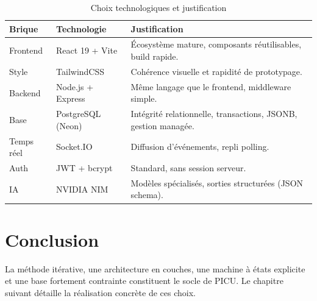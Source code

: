 \begin{table}[H]
\centering
\caption{Choix technologiques et justification}
\label{tab:choix}
\small
\begin{tabular}{|l|l|p{6.4cm}|}
\hline
\textbf{Brique} & \textbf{Technologie} & \textbf{Justification} \\
\hline
Frontend & React 19 + Vite & Écosystème mature, composants réutilisables, build rapide. \\
\hline
Style & TailwindCSS & Cohérence visuelle et rapidité de prototypage. \\
\hline
Backend & Node.js + Express & Même langage que le frontend, middleware simple. \\
\hline
Base & PostgreSQL (Neon) & Intégrité relationnelle, transactions, JSONB, gestion managée. \\
\hline
Temps réel & Socket.IO & Diffusion d'événements, repli polling. \\
\hline
Auth & JWT + bcrypt & Standard, sans session serveur. \\
\hline
IA & NVIDIA NIM & Modèles spécialisés, sorties structurées (JSON schema). \\
\hline
\end{tabular}
\end{table}

\section{Conclusion}

La méthode itérative, une architecture en couches, une machine à états explicite et une base fortement contrainte constituent le socle de PICU. Le chapitre suivant détaille la réalisation concrète de ces choix.
